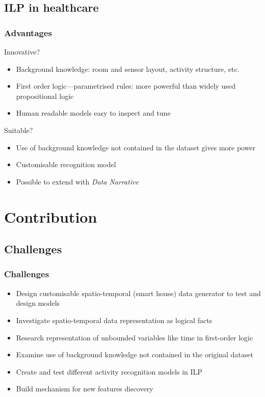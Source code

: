 \documentclass[09pt]{beamer}
\begin{document}
  \subsection{ILP in healthcare}
  \begin{frame}
    \frametitle{Advantages}
    \begin{block}{Innovative?}
      \begin{itemize}
        \item Background knowledge: room and sensor layout, activity structure, etc.\
        \item First order logic---parametrised rules: more powerful than widely used propositional logic
        \item Human readable models easy to inspect and tune
      \end{itemize}
    \end{block}
    \pause
    \begin{block}{Suitable?}
      \begin{itemize}
        \item Use of background knowledge not contained in the dataset gives more power
        \item Customisable recognition model
        \item Possible to extend with \emph{Data Narrative}
      \end{itemize}
    \end{block}
  \end{frame}

\section{Contribution}

  \subsection{Challenges}
  \begin{frame}
    \frametitle{Challenges}
    \begin{itemize}
      \item Design customisable spatio-temporal (smart house) data generator to test and design models
      \item Investigate spatio-temporal data representation as logical facts
      \item Research representation of unbounded variables like time in first-order logic
      \item Examine use of background knowledge not contained in the original dataset
      \item Create and test different activity recognition models in ILP
      \item Build mechanism for new features discovery
    \end{itemize}
  \end{frame}
\end{document}
